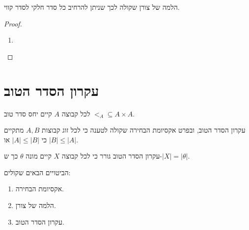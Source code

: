 \documentclass{tstextbook}
\begin{document}
\begin{proposition}
הלמה של צורן שקולה לכך שניתן להרחיב כל סדר חלקי לסדר קווי.

\end{proposition}
\begin{proof}
  \begin{enumerate}
    \item 
  \end{enumerate}
\end{proof}
\section{עקרון הסדר הטוב}

\begin{definition}
לכל קבוצה \(A\) קיים יחס סדר טוב \(<_{A}\subseteq A\times A\).

\end{definition}
\begin{proposition}
עקרון הסדר הטוב, ובפרט אקסיומת הבחירה שקולה לטענה כי לכל זוג קבוצות \(A,B\) מתקיים כי \(|A|\leq|B|\) או \(|B|\leq |A|\).

\end{proposition}
\begin{proposition}
עקרון הסדר הטוב גורר כי לכל קבוצה \(X\) קיים מונה \(\theta\) כך ש-\(|X|=|\theta|\).

\end{proposition}
\begin{theorem}[השקילות]
הביטויים הבאים שקולים:

  \begin{enumerate}
    \item אקסיומת הבחירה. 


    \item הלמה של צורן. 


    \item עקרון הסדר הטוב. 


  \end{enumerate}
\end{theorem}
\end{document}
